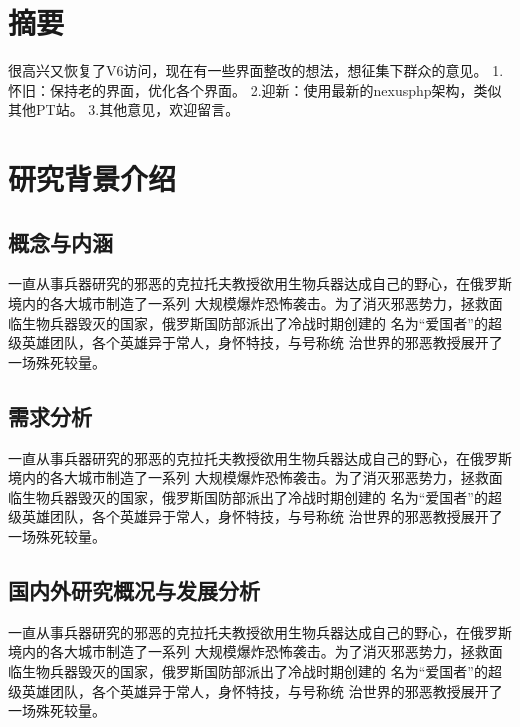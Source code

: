 \documentclass{icsartcn}
\begin{document}
\mainmatter

\section{摘要}
很高兴又恢复了V6访问，现在有一些界面整改的想法，想征集下群众的意见。
1.怀旧：保持老的界面，优化各个界面。
2.迎新：使用最新的nexusphp架构，类似其他PT站。
3.其他意见，欢迎留言。


\section{研究背景介绍}
\subsection{概念与内涵}
一直从事兵器研究的邪恶的克拉托夫教授欲用生物兵器达成自己的野心，在俄罗斯境内的各大城市制造了一系列
大规模爆炸恐怖袭击。为了消灭邪恶势力，拯救面临生物兵器毁灭的国家，俄罗斯国防部派出了冷战时期创建的
名为“爱国者”的超级英雄团队，各个英雄异于常人，身怀特技，与号称统 治世界的邪恶教授展开了一场殊死较量。


\subsection{需求分析}

一直从事兵器研究的邪恶的克拉托夫教授欲用生物兵器达成自己的野心，在俄罗斯境内的各大城市制造了一系列
大规模爆炸恐怖袭击。为了消灭邪恶势力，拯救面临生物兵器毁灭的国家，俄罗斯国防部派出了冷战时期创建的
名为“爱国者”的超级英雄团队，各个英雄异于常人，身怀特技，与号称统 治世界的邪恶教授展开了一场殊死较量。


\subsection{国内外研究概况与发展分析}

一直从事兵器研究的邪恶的克拉托夫教授欲用生物兵器达成自己的野心\cite{kandukuri2009cloud}，在俄罗斯境内的各大城市制造了一系列
大规模爆炸恐怖袭击。为了消灭邪恶势力，拯救面临生物兵器毁灭的国家，俄罗斯国防部派出了冷战时期创建的
名为“爱国者”的超级英雄团队，各个英雄异于常人，身怀特技，与号称统 治世界的邪恶教授展开了一场殊死较量。
\end{document}
